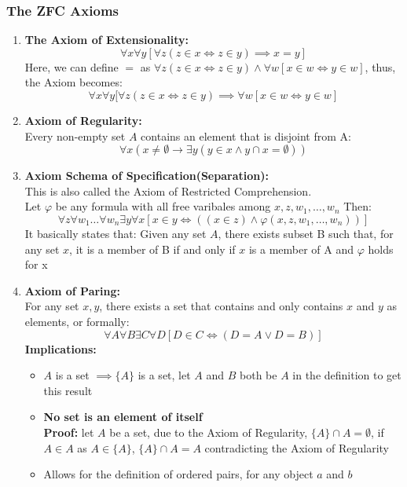 \documentclass{article}
\newcommand{\0}{{\bf{0}}}
\begin{document}
\subsubsection{The ZFC Axioms}
\begin{enumerate}
    \item {\textbf{The Axiom of Extensionality:}}
    $$\forall{}x\forall{}y[\forall{}z(z\in{}x\iff{}z\in{}y)\implies{}x=y]$$
    Here, we can define $=$ as $\forall{}z(z\in{}x\iff{}z\in{}y)\land\forall{}w[x\in{}w\iff{}y\in{}w]$, thus, the Axiom becomes:
    $$\forall{}x\forall{}y[\forall{}z(z\in{}x\iff{}z\in{}y)\implies\forall{}w[x\in{}w\iff{}y\in{}w]$$
    \item {\textbf{Axiom of Regularity:}}\\
    Every non-empty set $A$ contains an element that is disjoint from A:
    $$\forall{}x(x\neq\emptyset\rightarrow\exists{}y(y\in{}x\land{}y\cap{}x=\emptyset))$$
    \item {\textbf{Axiom Schema of Specification(Separation):}}\\
    This is also called the Axiom of Restricted Comprehension.\\
    Let $\varphi$ be any formula with all free varibales among $x,z,w_1,\dots,w_n$ Then:
    $$\forall{}z\forall{}w_1\dots\forall{}w_n\exists{}y\forall{}x[x\in{}y\iff((x\in{}z)\land\varphi(x,z,w_1,\dots,w_n))]$$
    It basically states that: Given any set $A$, there exists subset B such that, for any set $x$, it is a member of B if and only if $x$ is a member of A and $\varphi$ holds for x
    \item{\textbf{Axiom of Paring:}}\\
    For any set $x,y$, there exists a set that contains and only contains $x$ and $y$ as elements, or formally:
    $$\forall{A}\forall{B}\exists{C}\forall{D}[D\in{C}\iff(D=A\lor{}D=B)]$$
    \textbf{Implications:}
    \begin{itemize}
        \item $A$ is a set $\implies\{A\}$ is a set, let $A$ and $B$ both be $A$ in the definition to get this result
        \item \textbf{No set is an element of itself}\\
        \textbf{Proof:} let $A$ be a set, due to the Axiom of Regularity, $\{A\}\cap{}A=\emptyset$, if $A\in{}A$ as $A\in\{A\}$, $\{A\}\cap{}A=A$ contradicting the Axiom of Regularity
        \item Allows for the definition of ordered pairs, for any object $a$ and $b$\\

\end{itemize}
\end{enumerate}
\end{document}
